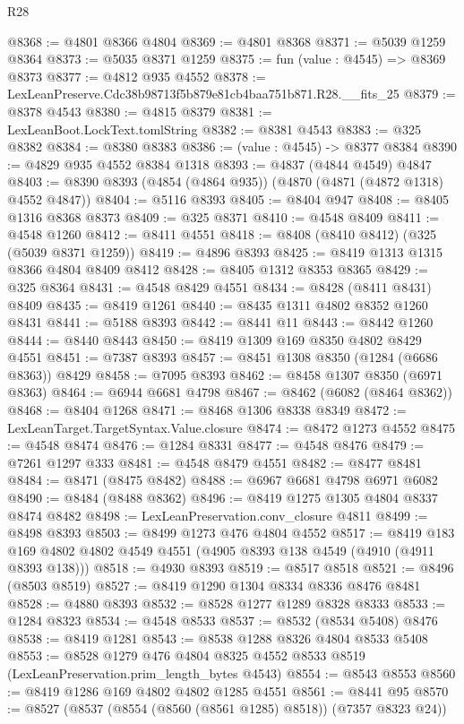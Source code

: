 \begin{lexlean}{R28}
\begin{coremodule}
@8368 := @4801 @8366 @4804
@8369 := @4801 @8368
@8371 := @5039 @1259 @8364
@8373 := @5035 @8371 @1259
@8375 := fun (value : @4545) => @8369 @8373
@8377 := @4812 @935 @4552
@8378 := LexLeanPreserve.Cdc38b98713f5b879e81cb4baa751b871.R28.__fits_25
@8379 := @8378 @4543
@8380 := @4815 @8379
@8381 := LexLeanBoot.LockText.tomlString
@8382 := @8381 @4543
@8383 := @325 @8382
@8384 := @8380 @8383
@8386 := (value : @4545) -> @8377 @8384
@8390 := @4829 @935 @4552 @8384 @1318
@8393 := @4837 (@4844 @4549) @4847
@8403 := @8390 @8393 (@4854 (@4864 @935)) (@4870 (@4871 (@4872 @1318) @4552 @4847))
@8404 := @5116 @8393
@8405 := @8404 @947
@8408 := @8405 @1316 @8368 @8373
@8409 := @325 @8371
@8410 := @4548 @8409
@8411 := @4548 @1260
@8412 := @8411 @4551
@8418 := @8408 (@8410 @8412) (@325 (@5039 @8371 @1259))
@8419 := @4896 @8393
@8425 := @8419 @1313 @1315 @8366 @4804 @8409 @8412
@8428 := @8405 @1312 @8353 @8365
@8429 := @325 @8364
@8431 := @4548 @8429 @4551
@8434 := @8428 (@8411 @8431) @8409
@8435 := @8419 @1261
@8440 := @8435 @1311 @4802 @8352 @1260 @8431
@8441 := @5188 @8393
@8442 := @8441 @11
@8443 := @8442 @1260
@8444 := @8440 @8443
@8450 := @8419 @1309 @169 @8350 @4802 @8429 @4551
@8451 := @7387 @8393
@8457 := @8451 @1308 @8350 (@1284 (@6686 @8363)) @8429
@8458 := @7095 @8393
@8462 := @8458 @1307 @8350 (@6971 @8363)
@8464 := @6944 @6681 @4798
@8467 := @8462 (@6082 (@8464 @8362))
@8468 := @8404 @1268
@8471 := @8468 @1306 @8338 @8349
@8472 := LexLeanTarget.TargetSyntax.Value.closure
@8474 := @8472 @1273 @4552
@8475 := @4548 @8474
@8476 := @1284 @8331
@8477 := @4548 @8476
@8479 := @7261 @1297 @333
@8481 := @4548 @8479 @4551
@8482 := @8477 @8481
@8484 := @8471 (@8475 @8482)
@8488 := @6967 @6681 @4798 @6971 @6082
@8490 := @8484 (@8488 @8362)
@8496 := @8419 @1275 @1305 @4804 @8337 @8474 @8482
@8498 := LexLeanPreservation.conv_closure @4811
@8499 := @8498 @8393
@8503 := @8499 @1273 @476 @4804 @4552
@8517 := @8419 @183 @169 @4802 @4802 @4549 @4551 (@4905 @8393 @138 @4549 (@4910 (@4911 @8393 @138)))
@8518 := @4930 @8393
@8519 := @8517 @8518
@8521 := @8496 (@8503 @8519)
@8527 := @8419 @1290 @1304 @8334 @8336 @8476 @8481
@8528 := @4880 @8393
@8532 := @8528 @1277 @1289 @8328 @8333
@8533 := @1284 @8323
@8534 := @4548 @8533
@8537 := @8532 (@8534 @5408) @8476
@8538 := @8419 @1281
@8543 := @8538 @1288 @8326 @4804 @8533 @5408
@8553 := @8528
    @1279
    @476
    @4804
    @8325
    @4552
    @8533
    @8519
    (LexLeanPreservation.prim_length_bytes @4543)
@8554 := @8543 @8553
@8560 := @8419 @1286 @169 @4802 @4802 @1285 @4551
@8561 := @8441 @95
@8570 := @8527 (@8537 (@8554 (@8560 (@8561 @1285) @8518)) (@7357 @8323 @24))

\end{coremodule}
\end{lexlean}
